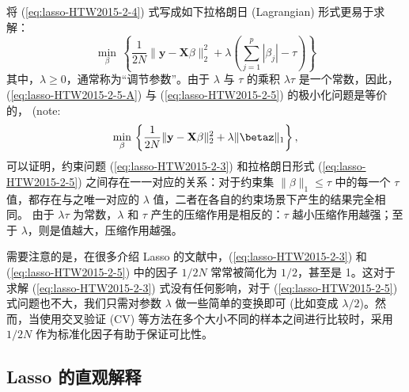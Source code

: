 将 (\ref{eq:lasso-HTW2015-2-4}) 式写成如下拉格朗日 (Lagrangian) 形式更易于求解：
\begin{equation}\label{eq:lasso-HTW2015-2-5-A}
\underset{\beta}{\operatorname{min}}\,
\left\{
    \frac{1}{2 N}\|\mathbf{y}-\mathbf{X} \beta\|_{2}^{2}
   +\lambda\left(\sum_{j=1}^{p}\left|\beta_{j}\right|-\tau\right)
\right\}
\end{equation}
其中，$\lambda \geq 0$，通常称为“调节参数”。由于 $\lambda$ 与 $\tau$ 的乘积 $\lambda \tau$ 是一个常数，因此，(\ref{eq:lasso-HTW2015-2-5-A}) 与 (\ref{eq:lasso-HTW2015-2-5}) 的极小化问题是等价的， (note: %
\begin{equation}\label{eq:lasso-HTW2015-2-5}
\underset{\beta}{\operatorname{min}}\,
\left\{\frac{1}{2 N}\|\mathbf{y}-\mathbf{X} \beta\|_{2}^{2}+\lambda\|\betaz\|_{1}\right\},
\end{equation}
可以证明，约束问题 (\ref{eq:lasso-HTW2015-2-3}) 和拉格朗日形式 (\ref{eq:lasso-HTW2015-2-5}) 之间存在一一对应的关系：对于约束集 $\|\beta\|_{1} \leq \tau$ 中的每一个 $\tau$ 值，都存在与之唯一对应的 $\lambda$ 值，二者在各自的约束场景下产生的结果完全相同。
由于 $\lambda \tau$ 为常数，$\lambda$ 和 $\tau$ 产生的压缩作用是相反的：$\tau$ 越小压缩作用越强；至于 $\lambda$，则是值越大，压缩作用越强。



需要注意的是，在很多介绍 Lasso 的文献中，(\ref{eq:lasso-HTW2015-2-3}) 和 (\ref{eq:lasso-HTW2015-2-5}) 中的因子 $1/2N$ 常常被简化为 $1/2$，甚至是 1。这对于求解 (\ref{eq:lasso-HTW2015-2-3}) 式没有任何影响，对于 (\ref{eq:lasso-HTW2015-2-5}) 式问题也不大，我们只需对参数 $\lambda$ 做一些简单的变换即可 (比如变成 $\lambda/2$)。然而，当使用交叉验证 (CV) 等方法在多个大小不同的样本之间进行比较时，采用 $1/2N$ 作为标准化因子有助于保证可比性。 

\subsection{Lasso 的直观解释}

